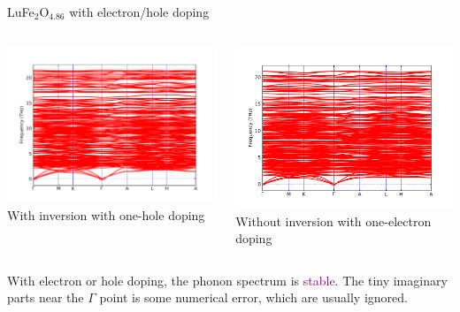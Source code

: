 \documentclass{beamer}
\begin{document}
\begin{frame}{LuFe\(_2\)O\(_{4.86}\) with electron/hole doping}
  \begin{columns}
    \begin{column}{0.5\textwidth}
      \centering
      \includegraphics[width=\textwidth]{figure/wI-h1.pdf}
      \scriptsize With inversion with one-hole doping
    \end{column}
    \begin{column}{0.5\textwidth}
      \centering
      \includegraphics[width=\textwidth]{figure/woI-e1.pdf}
      \scriptsize Without inversion with one-electron doping
    \end{column}
  \end{columns}
  \begin{block}{}
    With electron or hole doping, the phonon spectrum is \textcolor{purple}{stable}. The tiny imaginary parts near the \(\Gamma\) point is some numerical error, which are usually ignored.
  \end{block}
\end{frame}
\end{document}
